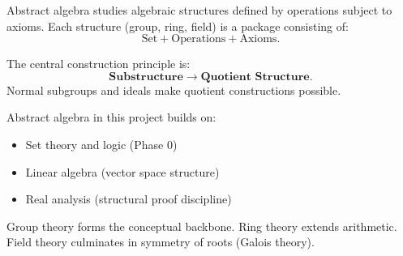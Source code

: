 
\vspace{1em}

\begin{remark}
Abstract algebra studies algebraic structures defined by operations
subject to axioms. Each structure (group, ring, field) is a
package consisting of:
\[
\text{Set} + \text{Operations} + \text{Axioms}.
\]
\end{remark}

\begin{remark}
The central construction principle is:
\[
\textbf{Substructure} \longrightarrow \textbf{Quotient Structure}.
\]
Normal subgroups and ideals make quotient constructions possible.
\end{remark}

\begin{remark}
Abstract algebra in this project builds on:

\begin{itemize}
    \item Set theory and logic (Phase 0)
    \item Linear algebra (vector space structure)
    \item Real analysis (structural proof discipline)
\end{itemize}

Group theory forms the conceptual backbone.
Ring theory extends arithmetic.
Field theory culminates in symmetry of roots (Galois theory).
\end{remark}






% 
% 
% 
% 
% 
% 
% 
% 
% 

